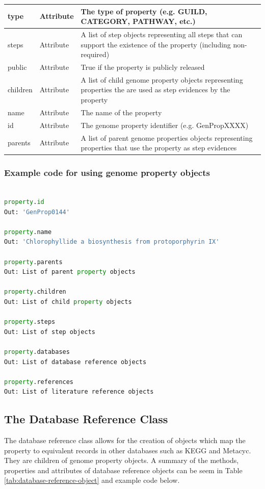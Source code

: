 \begin{longtable}{|p{2.7cm}|p{2cm}|p{10cm}|}
type & Attribute & The type of property (e.g. GUILD, CATEGORY, PATHWAY, etc.) \\ \hline
steps & Attribute & A list of step objects representing all steps that can support the existence of the property (including non-required) \\ \hline
public & Attribute & True if the property is publicly released \\ \hline
children & Attribute & A list of child genome property objects representing properties the are used as step evidences by the property \\ \hline
name & Attribute & The name of the property \\ \hline
id & Attribute & The genome property identifier (e.g. GenPropXXXX) \\ \hline
parents & Attribute & A list of parent genome properties objects representing properties that use the property as step evidences \\ \hline
\end{longtable}

\subsubsection{Example code for using genome property objects}

\begin{lstlisting}[language=Python]

property.id
Out: 'GenProp0144'
	
property.name
Out: 'Chlorophyllide a biosynthesis from protoporphyrin IX'

property.parents
Out: List of parent property objects

property.children	
Out: List of child property objects

property.steps
Out: List of step objects		
	
property.databases
Out: List of database reference objects

property.references
Out: List of literature reference objects

\end{lstlisting}

\subsection{The Database Reference Class}

The database reference class allows for the creation of objects which map the property to equivalent records in other databases such as KEGG and Metacyc. They are children of genome property objects. A summary of the methods, properties and attributes of database reference objects can be seem in Table \ref{tab:database-reference-object} and example code below.

